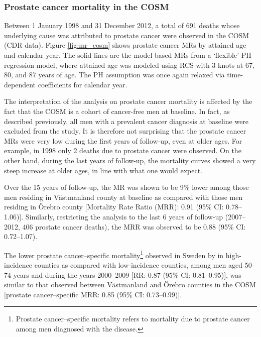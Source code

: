 \subsubsection{Prostate cancer mortality in the COSM}

Between 1 January 1998 and 31 December 2012, a total of 691 deaths whose underlying cause was attributed to prostate cancer were observed in the COSM (CDR data). Figure \ref{fig:mr_cosm} shows prostate cancer MRs by attained age and calendar year. The solid lines are the model-based MRs from a `flexible' PH regression model, where attained age was modeled using RCS with 3 knots at 67, 80, and 87 years of age. The PH assumption was once again relaxed via time-dependent coefficients for calendar year. %

The interpretation of the analysis on prostate cancer mortality is affected by the fact that the COSM is a cohort of cancer-free men at baseline. In fact, as described previously, all men with a prevalent cancer diagnosis at baseline were excluded from the study. It is therefore not surprising that the prostate cancer MRs were very low during the first years of follow-up, even at older ages. For example, in 1998 only 2 deaths due to prostate cancer were observed. On the other hand, during the last years of follow-up, the mortality curves showed a very steep increase at older ages, in line with what one would expect.

Over the 15 years of follow-up, the MR was shown to be 9\% lower among those men residing in Västmanland county at baseline as compared with those men residing in Örebro county [Mortality Rate Ratio (MRR): 0.91 (95\% CI: 0.78--1.06)]. Similarly, restricting the analysis to the last 6 years of follow-up (2007--2012, 406 prostate cancer deaths), the MRR was observed to be 0.88 (95\% CI: 0.72--1.07). 

The lower prostate cancer--specific mortality\footnote{Prostate cancer--specific mortality refers to mortality due to prostate cancer among men diagnosed with the disease.} observed in Sweden by \citet{stattin_prostate_2014} in high-incidence counties as compared with low-incidence counties, among men aged 50--74 years and during the years 2000--2009 [RR: 0.87 (95\% CI: 0.81--0.95)], was similar to that observed between Västmanland and Örebro counties in the COSM [prostate cancer--specific MRR: 0.85 (95\% CI: 0.73--0.99)].

